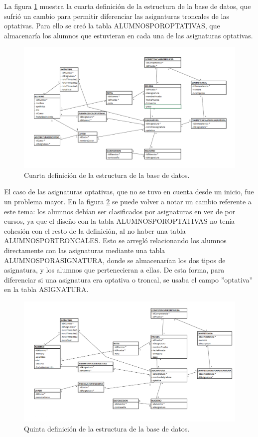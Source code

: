 \newpage
La figura \ref{Fig:ADB_Definition_4} muestra la cuarta definición de la estructura de la base de datos, que sufrió un cambio para permitir diferenciar las asignaturas troncales de las optativas. Para ello se creó la tabla ALUMNOSPOROPTATIVAS, que almacenaría los alumnos que estuvieran en cada una de las asignaturas optativas.

\begin{figure}[H]
\centering\includegraphics[width=1\linewidth]{figs/DB_Definition_4.png}
\caption{Cuarta definición de la estructura de la base de datos.}
\label{Fig:ADB_Definition_4}
\end{figure}

\newpage
El caso de las asignaturas optativas, que no se tuvo en cuenta desde un inicio, fue un problema mayor. En la figura \ref{Fig:ADB_Definition_5} se puede volver a notar un cambio referente a este tema: los alumnos debían ser clasificados por asignaturas en vez de por cursos, ya que el diseño con la tabla ALUMNOSPOROPTATIVAS no tenía cohesión con el resto de la definición, al no haber una tabla ALUMNOSPORTRONCALES. Esto se arregló relacionando los alumnos directamente con las asignaturas mediante una tabla ALUMNOSPORASIGNATURA, donde se almacenarían los dos tipos de asignatura, y los alumnos que pertenecieran a ellas. De esta forma, para diferenciar si una asignatura era optativa o troncal, se usaba el campo ''optativa'' en la tabla ASIGNATURA.

\begin{figure}[H]
\centering\includegraphics[width=1\linewidth]{figs/DB_Definition_5.png}
\caption{Quinta definición de la estructura de la base de datos.}
\label{Fig:ADB_Definition_5}
\end{figure}

